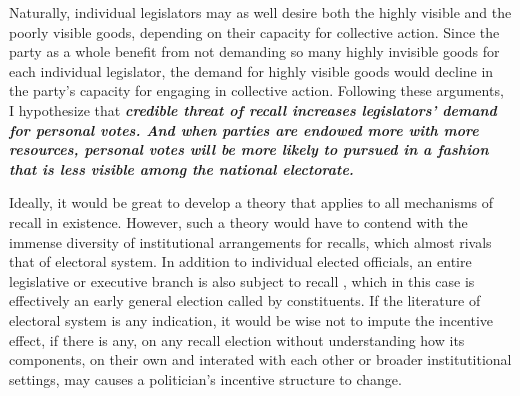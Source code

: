 \documentclass[hyphens, crop=false]{standalone}
\begin{document}
		Naturally,
		individual legislators may as well desire both the highly visible and the poorly visible goods,
		depending on their capacity for collective action.
		Since the party as a whole benefit from not demanding so many highly invisible goods for each individual legislator,
		the demand for highly visible goods would decline in the party's capacity for engaging in collective action.
		Following these arguments,
		I hypothesize that
		\textbf
		{
			\textit
			{
				credible threat of recall increases legislators' demand for personal votes.
				And when parties are endowed more with more resources,
				personal votes will be more likely to pursued in a fashion that is less visible among the national electorate.
			}
		}
		
		



		Ideally, it would be great to develop a theory that applies to all mechanisms of recall in existence.
		However, such a theory would have to contend with the immense diversity of 
		institutional arrangements for recalls, which
		almost rivals that of electoral system.
		In addition to individual elected officials,
		an entire legislative or executive branch is also subject to recall
		\autocite{welpRecallReferendumWorld2020},
		which in this case is effectively an early general election called by constituents.
		If the literature of electoral system is any indication, it would be wise not to impute the
		incentive effect,
		if there is any,
		on any recall election without understanding how 
		its components,
		on their own and interated with each other or broader institutitional settings,
		may causes a politician's incentive structure to change.
		
\end{document}
